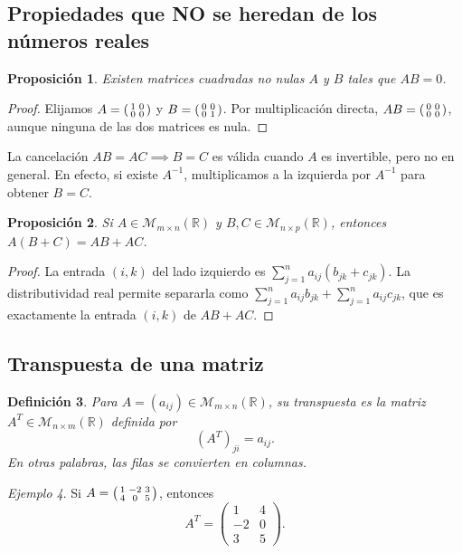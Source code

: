 \documentclass[12pt]{article}
\newtheorem{definicion}{Definición}[section]
\newtheorem{proposicion}[definicion]{Proposición}
\theoremstyle{remark}
\newtheorem{ejemplo}[definicion]{Ejemplo}
\newcommand{\R}{\mathbb{R}}
\newcommand{\Mat}[2]{\mathcal{M}_{#1\times #2}}
\begin{document}
\subsection*{Propiedades que NO se heredan de los números reales}
\begin{proposicion}
Existen matrices cuadradas no nulas $A$ y $B$ tales que $AB=0$.
\end{proposicion}
\begin{proof}
Elijamos $A=\begin{psmallmatrix}1&0\\0&0\end{psmallmatrix}$ y $B=\begin{psmallmatrix}0&0\\0&1\end{psmallmatrix}$. Por multiplicación directa, $AB=\begin{psmallmatrix}0&0\\0&0\end{psmallmatrix}$, aunque ninguna de las dos matrices es nula.
\end{proof}
La cancelación $AB=AC\implies B=C$ es válida cuando $A$ es invertible, pero no en general. En efecto, si existe $A^{-1}$, multiplicamos a la izquierda por $A^{-1}$ para obtener $B=C$.
\begin{proposicion}
Si $A\in\Mat{m}{n}(\R)$ y $B,C\in\Mat{n}{p}(\R)$, entonces $A(B+C)=AB+AC$.
\end{proposicion}
\begin{proof}
La entrada $(i,k)$ del lado izquierdo es $\sum_{j=1}^{n}a_{ij}(b_{jk}+c_{jk})$. La distributividad real permite separarla como $\sum_{j=1}^{n}a_{ij}b_{jk}+\sum_{j=1}^{n}a_{ij}c_{jk}$, que es exactamente la entrada $(i,k)$ de $AB+AC$.
\end{proof}

\subsection*{Transpuesta de una matriz}
\begin{definicion}
Para $A=(a_{ij})\in\Mat{m}{n}(\R)$, su \emph{transpuesta} es la matriz $A^T\in\Mat{n}{m}(\R)$ definida por
\[
(A^T)_{ji}=a_{ij}.
\]
En otras palabras, las filas se convierten en columnas.
\end{definicion}
\begin{ejemplo}
Si $A=\begin{psmallmatrix}1&-2&3\\4&0&5\end{psmallmatrix}$, entonces
\[
A^T=\begin{pmatrix}1&4\\-2&0\\3&5\end{pmatrix}.
\]
\end{ejemplo}
\end{document}
